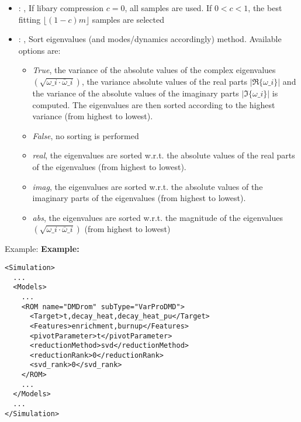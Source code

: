 \begin{itemize}
    \item {}: ,
      If libary compression $c = 0$, all samples are used. If $0 < c < 1$, the best fitting
      $\lfloor \left(1 - c\right)m\rfloor$ samples are selected

    \item {}: ,
      Sort eigenvalues (and modes/dynamics accordingly) method. Available options are:
      \begin{itemize}                                                   \item \textit{True}, the
      variance of the absolute values of the complex eigenvalues
      $\left(\sqrt{\omega\_i \cdot \bar{\omega}\_i}\right)$, the variance absolute values
      of the real parts $\left|\Re\{{\omega\_i}\}\right|$ and the variance of the absolute
      values of the imaginary parts $\left|\Im\{{\omega\_i}\}\right|$ is computed. The
      eigenvalues are then sorted according to the highest variance (from highest to lowest).
      \item \textit{False}, no sorting is performed
      \item \textit{real}, the eigenvalues are sorted w.r.t. the absolute values of the real
      parts of the eigenvalues (from highest to lowest).
      \item \textit{imag}, the eigenvalues are sorted w.r.t. the absolute values of the imaginary
      parts of the eigenvalues (from highest to lowest).
      \item \textit{abs}, the eigenvalues are sorted w.r.t. the magnitude of the eigenvalues
      $\left(\sqrt{\omega\_i \cdot \bar{\omega}\_i}\right)$ (from highest to lowest)
      \end{itemize}
  \end{itemize}

\hspace{24pt}
Example:
\textbf{Example:}
\begin{lstlisting}[style=XML,morekeywords={name,subType}]
<Simulation>
  ...
  <Models>
    ...
    <ROM name="DMDrom" subType="VarProDMD">
      <Target>t,decay_heat,decay_heat_pu</Target>
      <Features>enrichment,burnup</Features>
      <pivotParameter>t</pivotParameter>
      <reductionMethod>svd</reductionMethod>
      <reductionRank>0</reductionRank>
      <svd_rank>0</svd_rank>
    </ROM>
    ...
  </Models>
  ...
</Simulation>
\end{lstlisting}

